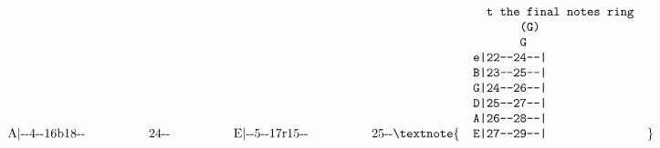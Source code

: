 \documentclass[12pt]{article}
\begin{document}
\begin{songs}{}
\[{{\hbox{\hskip\dimen0\relax \hskip\dimen0\relax \char65\relax \char124\relax \char45\relax \char45\relax \char52\relax \char45\relax \char45\relax \char49\relax \char54\relax \char98\relax \char49\relax \char56\relax \char45\relax \char45\relax \hskip\dimen0\relax \hskip\dimen0\relax \char50\relax \char52\relax \char45\relax \char45\relax }
\hbox{\hskip\dimen0\relax \hskip\dimen0\relax \char69\relax \char124\relax \char45\relax \char45\relax \char53\relax \char45\relax \char45\relax \char49\relax \char55\relax \char114\relax \char49\relax \char53\relax \char45\relax \char45\relax \hskip\dimen0\relax \hskip\dimen0\relax \char50\relax \char53\relax \char45\relax \char45\relax }
}}

\textnote{\vbox{\fontencoding{OT1}\fontfamily{cmtt}\fontsize{10}{12}\selectfont
\setbox0=\hbox{\char48\relax}\dimen0=\wd0\relax
\hbox{\hskip\dimen0\relax \hskip\dimen0\relax \hskip\dimen0\relax \hskip\dimen0\relax \char116\relax \hskip\dimen0\relax \char116\relax \char104\relax \char101\relax \hskip\dimen0\relax \char102\relax \char105\relax \char110\relax \char97\relax \char108\relax \hskip\dimen0\relax \char110\relax \char111\relax \char116\relax \char101\relax \char115\relax \hskip\dimen0\relax \char114\relax \char105\relax \char110\relax \char103\relax \hskip\dimen0\relax \hskip\dimen0\relax }
\hbox{\hskip\dimen0\relax \hskip\dimen0\relax \hskip\dimen0\relax \hskip\dimen0\relax \hskip\dimen0\relax \hskip\dimen0\relax \hskip\dimen0\relax \hskip\dimen0\relax \hskip\dimen0\relax \char40\relax \char71\relax \char41\relax \hskip\dimen0\relax \hskip\dimen0\relax }
\hbox{\hskip\dimen0\relax \hskip\dimen0\relax \hskip\dimen0\relax \hskip\dimen0\relax \hskip\dimen0\relax \hskip\dimen0\relax \hskip\dimen0\relax \hskip\dimen0\relax \hskip\dimen0\relax \char71\relax \hskip\dimen0\relax \hskip\dimen0\relax }
\hbox{\hskip\dimen0\relax \hskip\dimen0\relax \char101\relax \char124\relax \char50\relax \char50\relax \char45\relax \char45\relax \char50\relax \char52\relax \char45\relax \char45\relax \char124\relax \hskip\dimen0\relax \hskip\dimen0\relax }
\hbox{\hskip\dimen0\relax \hskip\dimen0\relax \char66\relax \char124\relax \char50\relax \char51\relax \char45\relax \char45\relax \char50\relax \char53\relax \char45\relax \char45\relax \char124\relax \hskip\dimen0\relax \hskip\dimen0\relax }
\hbox{\hskip\dimen0\relax \hskip\dimen0\relax \char71\relax \char124\relax \char50\relax \char52\relax \char45\relax \char45\relax \char50\relax \char54\relax \char45\relax \char45\relax \char124\relax \hskip\dimen0\relax \hskip\dimen0\relax }
\hbox{\hskip\dimen0\relax \hskip\dimen0\relax \char68\relax \char124\relax \char50\relax \char53\relax \char45\relax \char45\relax \char50\relax \char55\relax \char45\relax \char45\relax \char124\relax \hskip\dimen0\relax \hskip\dimen0\relax }
\hbox{\hskip\dimen0\relax \hskip\dimen0\relax \char65\relax \char124\relax \char50\relax \char54\relax \char45\relax \char45\relax \char50\relax \char56\relax \char45\relax \char45\relax \char124\relax \hskip\dimen0\relax \hskip\dimen0\relax }
\hbox{\hskip\dimen0\relax \hskip\dimen0\relax \char69\relax \char124\relax \char50\relax \char55\relax \char45\relax \char45\relax \char50\relax \char57\relax \char45\relax \char45\relax \char124\relax \hskip\dimen0\relax \hskip\dimen0\relax }
}}

\]
\end{songs}
\end{document}
